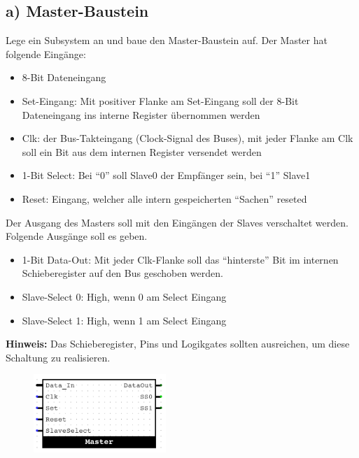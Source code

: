 \documentclass[a4paper]{scrartcl}
\begin{document}
\subsection*{a) Master-Baustein}
Lege ein Subsystem an und baue den Master-Baustein auf. Der Master hat folgende Eingänge:
\begin{itemize}
  \item 8-Bit Dateneingang
  \item Set-Eingang: Mit positiver Flanke am Set-Eingang soll der 8-Bit Dateneingang ins interne Register übernommen werden
  \item Clk: der Bus-Takteingang (Clock-Signal des Buses), mit jeder Flanke am Clk soll ein  Bit aus dem internen Register versendet werden
  \item 1-Bit Select: Bei ``0'' soll Slave0 der Empfänger sein, bei ``1'' Slave1
  \item Reset: Eingang, welcher alle intern gespeicherten ``Sachen'' reseted
\end{itemize}
Der Ausgang des Masters soll mit den Eingängen der Slaves verschaltet werden. Folgende Ausgänge soll es geben.
\begin{itemize}
  \item 1-Bit Data-Out: Mit jeder Clk-Flanke soll das ``hinterste'' Bit im internen Schieberegister auf den Bus geschoben werden.
  \item Slave-Select 0: High, wenn 0 am Select Eingang
  \item Slave-Select 1: High, wenn 1 am Select Eingang
\end{itemize}
\textbf{Hinweis:}
Das Schieberegister, Pins und Logikgates sollten ausreichen, um diese Schaltung zu realisieren.

\begin{figure}[h]
  \begin{center}
  \includegraphics[width=5cm]{Master.png}
\end{center}
\end{figure}
\end{document}
